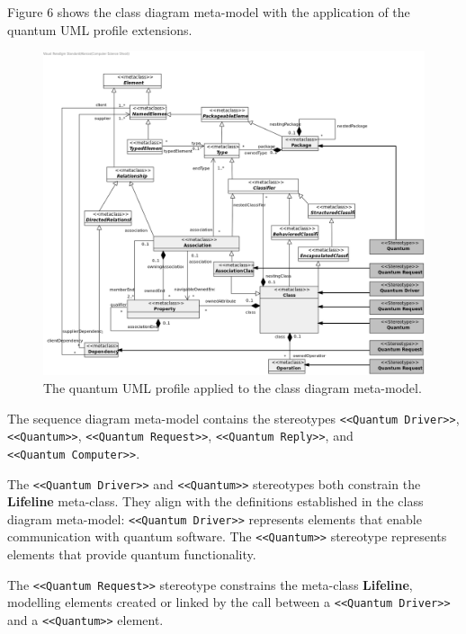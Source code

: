 \documentclass{article}
\newcounter{subsubsubsection}[subsubsection]
\begin{document}
Figure 6 shows the class diagram meta-model with the application of the quantum UML profile extensions.

\begin{figure}
    \centering
    \includegraphics[width=1\linewidth]{QuantumUMLProfile-ClassDiagram.png}
    \caption{The quantum UML profile applied to the class diagram meta-model\cite{PerezCastillo2021Git}.}
    \label{fig:QUMLPD_CD}
\end{figure}


The sequence diagram meta-model contains the stereotypes \texttt{<<Quantum Driver>>}, \texttt{<<Quantum>>}, \texttt{<<Quantum Request>>}, \texttt{<<Quantum Reply>>}, and \\ \texttt{<<Quantum Computer>>}.

The \texttt{<<Quantum Driver>>} and \texttt{<<Quantum>>} stereotypes both constrain the \textbf{Lifeline} meta-class. They align with the definitions established in the class diagram meta-model: \texttt{<<Quantum Driver>>} represents elements that enable communication with quantum software. The \texttt{<<Quantum>>} stereotype represents elements that provide quantum functionality.

The \texttt{<<Quantum Request>>} stereotype constrains the meta-class \textbf{Lifeline}, modelling elements created or linked by the call between a \texttt{<<Quantum Driver>>} and a \texttt{<<Quantum>>} element\cite{Pérez-Castillo2022}.
\end{document}

